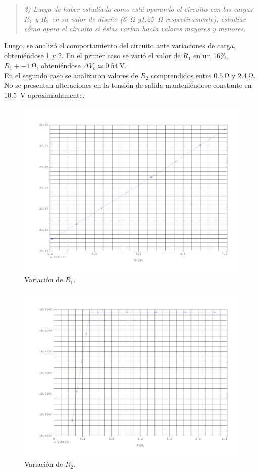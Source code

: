\begin{quote} \textit{2) Luego de haber estudiado como está operando el circuito con las cargas $R_1$ y $R_2$ en su valor de diseño (\SI{6}{\ohm} y\SI{1.25}{\ohm} respectivamente), estudiar cómo opera el circuito si éstas varían hacia valores mayores y menores.}
\end{quote}
	Luego, se analizó el comportamiento del circuito ante variaciones de carga, obteniéndose \ref{fig:var_R1} y \ref{fig:var_R2}. En el primer caso se varió el valor de $R_1$ en un 16\%, $R_1 +- \SI{1}{\ohm}$, obteniéndose $\Delta V_o \simeq \SI{0.54}{\volt}$.\\
	En el segundo caso se analizaron valores de $R_2$ comprendidos entre $\SI{0.5}{\ohm}$ y $\SI{2.4}{\ohm}$. No se presentan alteraciones en la tensión de salida manteniéndose constante en \SI{10.5}{\volt} aproximadamente.

\begin{figure}[H]
	\centering
	\includegraphics[scale=0.5]{Figuras/2_var_R1.pdf}
	\caption{Variación de $R_1$.}
	\label{fig:var_R1}
\end{figure}

\begin{figure}[H]
	\centering
	\includegraphics[scale=0.5]{Figuras/2_var_R2.pdf}
	\caption{Variación de $R_2$.}
	\label{fig:var_R2}
\end{figure}



